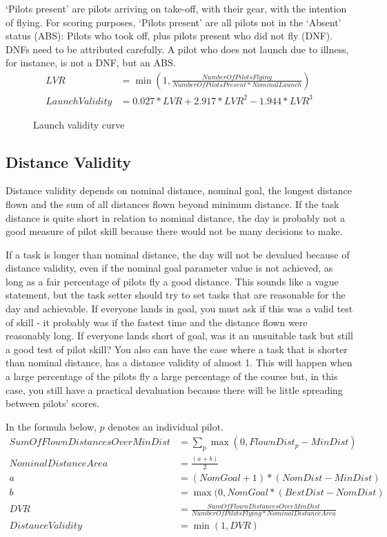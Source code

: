 \documentclass{article}
\begin{document}
‘Pilots present’ are pilots arriving on take-off, with their gear, with the
intention of flying. For scoring purposes, ‘Pilots present’ are all pilots not
in the ‘Absent’ status (ABS): Pilots who took off, plus pilots present who did
not fly (DNF). DNFs need to be attributed carefully. A pilot who does not
launch due to illness, for instance, is not a DNF, but an ABS.
\begin{align*}
    LVR &= \min(1, \frac{NumberOfPilotsFlying}{NumberOfPilotsPresent * NominalLaunch}) \\
    LaunchValidity &= 0.027 * LVR + 2.917 * LVR^2 - 1.944 * LVR^3
\end{align*}

\begin{figure}[h!]
    \centering
    
    \caption{Launch validity curve}
\end{figure}

\subsection{Distance Validity}
\label{sec:distance-validity}
Distance validity depends on nominal distance, nominal goal, the longest
distance flown and the sum of all distances flown beyond minimum distance. If
the task distance is quite short in relation to nominal distance, the day is
probably not a good measure of pilot skill because there would not be many
decisions to make.

If a task is longer than nominal distance, the day will not be devalued because
of distance validity, even if the nominal goal parameter value is not achieved,
as long as a fair percentage of pilots fly a good distance. This sounds like
a vague statement, but the task setter should try to set tasks that are
reasonable for the day and achievable. If everyone lands in goal, you must ask
if this was a valid test of skill - it probably was if the fastest time and the
distance flown were reasonably long. If everyone lands short of goal, was it an
unsuitable task but still a good test of pilot skill? You also can have the
case where a task that is shorter than nominal distance, has a distance
validity of almost 1. This will happen when a large percentage of the pilots
fly a large percentage of the course but, in this case, you still have
a practical devaluation because there will be little spreading between pilots’
scores.

In the formula below, \(p\) denotes an individual pilot.
\begin{align*}
    SumOfFlownDistancesOverMinDist &= \sum_p \max(0, FlownDist_p - MinDist) \\
    NominalDistanceArea &= \frac{(a + b)}{2} \\
    a &= (NomGoal + 1) * (NomDist - MinDist) \\
    b &= \max(0, NomGoal * (BestDist - NomDist) \\
    DVR &= \frac{SumOfFlownDistancesOverMinDist}{NumberOfPilotsFlying * NominalDistanceArea} \\
    DistanceValidity &= \min(1, DVR)
\end{align*}
\end{document}
